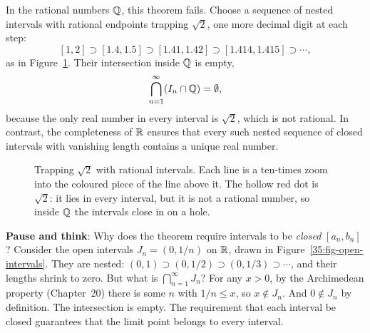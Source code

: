 In the rational numbers $\mathbb{Q}$, this theorem fails. Choose a sequence of nested intervals with rational endpoints trapping $\sqrt{2}$, one more decimal digit at each step:
\[
[1, 2] \supset [1.4, 1.5] \supset [1.41, 1.42] \supset [1.414, 1.415] \supset \cdots,
\]
as in Figure~\ref{35:fig-sqrt2-zoom}. Their intersection inside $\mathbb{Q}$ is empty,
\[
\bigcap_{n=1}^\infty (I_n \cap \mathbb{Q}) = \emptyset,
\]
because the only real number in every interval is $\sqrt{2}$, which is not rational. In contrast, the completeness of $\mathbb{R}$ ensures that every such nested sequence of closed intervals with vanishing length contains a unique real number.

\begin{figure}[htbp]
\centering
{}
\caption{Trapping $\sqrt{2}$ with rational intervals. Each line is a ten-times zoom into the coloured piece of the line above it. The hollow red dot is $\sqrt{2}$: it lies in every interval, but it is not a rational number, so inside $\mathbb{Q}$ the intervals close in on a hole.}
\label{35:fig-sqrt2-zoom}
\end{figure}

\begin{recoverybox}
\textbf{Pause and think}: Why does the theorem require intervals to be \emph{closed} $[a_n, b_n]$? Consider the open intervals $J_n = (0, 1/n)$ on $\mathbb{R}$, drawn in Figure~\ref{35:fig-open-intervals}. They are nested: $(0, 1) \supset (0, 1/2) \supset (0, 1/3) \supset \cdots$, and their lengths shrink to zero. But what is $\bigcap_{n=1}^\infty J_n$? For any $x > 0$, by the Archimedean property (Chapter~20) there is some $n$ with $1/n \le x$, so $x \notin J_n$. And $0 \notin J_n$ by definition. The intersection is empty. The requirement that each interval be closed guarantees that the limit point belongs to every interval.
\end{recoverybox}

